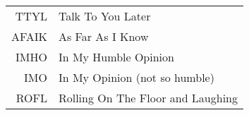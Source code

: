 


\begin{center}
\label{abbrv}
\begin{tabular}{r l}
	TTYL & Talk To You Later \\
	AFAIK & As Far As I Know \\
	IMHO & In My Humble Opinion \\
	IMO & In My Opinion (not so humble)\\
	ROFL & Rolling On The Floor and Laughing
\end{tabular}
\end{center}


\newpage

